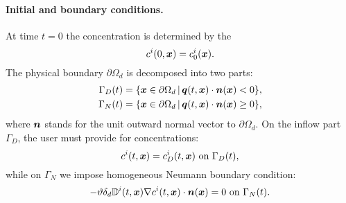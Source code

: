\paragraph{Initial and boundary conditions.}
At time $t=0$ the concentration is determined by the 
$$ c^i(0,\mathbf{\boldsymbol{x}}) = c^i_0(\mathbf{\boldsymbol{x}}). $$
The physical boundary $\partial\Omega_d$ is decomposed into two parts:
\begin{align*}
\Gamma_D(t) &= \{\mathbf{\boldsymbol{x}}\in \partial\Omega_d\,|\, \mathbf{\boldsymbol{q}}(t,\mathbf{\boldsymbol{x}})\cdot\mathbf{\boldsymbol{n}}(\mathbf{\boldsymbol{x}})<0\},\\
\Gamma_N(t) &= \{\mathbf{\boldsymbol{x}}\in \partial\Omega_d\,|\, \mathbf{\boldsymbol{q}}(t,\mathbf{\boldsymbol{x}})\cdot\mathbf{\boldsymbol{n}}(\mathbf{\boldsymbol{x}})\ge 0\},
\end{align*}
where $\mathbf{\boldsymbol{n}}$ stands for the unit outward normal vector to $\partial\Omega_d$.
On the inflow part $\Gamma_D$, the user must provide  for concentrations:
$$ c^i(t,\mathbf{\boldsymbol{x}}) = c^i_D(t,\mathbf{\boldsymbol{x}}) \mbox{ on }\Gamma_D(t), $$
while on $\Gamma_N$ we impose homogeneous Neumann boundary condition:
$$ -\vartheta\delta_d{{\mathbb{D}}}^i(t,\mathbf{\boldsymbol{x}})\nabla c^i(t,\mathbf{\boldsymbol{x}})\cdot\mathbf{\boldsymbol{n}}(\mathbf{\boldsymbol{x}}) = 0 \mbox{ on }\Gamma_N(t). $$






